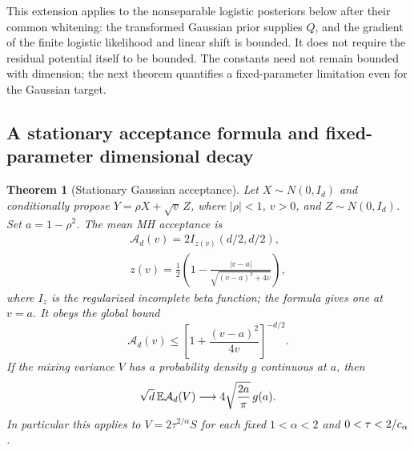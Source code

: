 \documentclass[pdflatex,iicol,sn-mathphys-ay]{sn-jnl}
\newtheorem{theorem}{Theorem}[section]
\theoremstyle{definition}\newtheorem{definition}[theorem]{Definition}
\theoremstyle{remark}\newtheorem{remark}[theorem]{Remark}
\numberwithin{equation}{section}
\newcommand{\1}{\mathbf 1}
\begin{document}
This extension applies to the nonseparable logistic posteriors below after their common whitening: the transformed Gaussian prior supplies $Q$, and the gradient of the finite logistic likelihood and linear shift is bounded. It does not require the residual potential itself to be bounded. The constants need not remain bounded with dimension; the next theorem quantifies a fixed-parameter limitation even for the Gaussian target.

\subsection{A stationary acceptance formula and fixed-parameter dimensional decay}
\begin{theorem}[Stationary Gaussian acceptance]\label{thm:accept}
Let $X\sim N(0,I_d)$ and conditionally propose $Y=\rho X+\sqrt v\,Z$, where $|\rho|<1$, $v>0$, and $Z\sim N(0,I_d)$. Set $a=1-\rho^2$. The mean MH acceptance is
\begin{equation}
\begin{gathered}
\mathcal A_d(v)=2I_{z(v)}(d/2,d/2),\\
z(v)=\frac12\left(1-\frac{|v-a|}{\sqrt{(v-a)^2+4v}}\right),
\end{gathered}\label{eq:acceptbeta}
\end{equation}
where $I_z$ is the regularized incomplete beta function; the formula gives one at $v=a$.
It obeys the global bound
\begin{equation}
\mathcal A_d(v)\le\left[1+\frac{(v-a)^2}{4v}\right]^{-d/2}.\label{eq:hellingeraccept}
\end{equation}
If the mixing variance $V$ has a probability density $g$ continuous at $a$, then
\begin{equation}
\sqrt d\,\mathbb E\mathcal A_d(V)\longrightarrow
4\sqrt{\frac{2a}{\pi}}\,g(a).\label{eq:acceptasymptotic}
\end{equation}
In particular this applies to $V=2\tau^{2/\alpha}S$ for each fixed $1<\alpha<2$ and $0<\tau<2/c_\alpha$.
\end{theorem}
\end{document}
